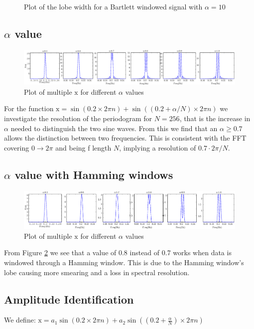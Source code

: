 \documentclass[10pt,twoside,a4paper]{report}
\begin{document}
\begin{figure}[h!]
\centering

\resizebox{\textwidth}{!}{}
\caption{Plot of the lobe width for a Bartlett windowed signal with $\alpha = 10$}
\label{fig:3d2}
\end{figure}
\subsection{$\alpha$ value}
\begin{figure}[h!]
\centering
\includegraphics[width=\textwidth]{cw1im/3b.eps}
\caption{Plot of multiple $\boldsymbol{\mathrm{x}}$ for different $\alpha$ values}
\end{figure}
For the function $\boldsymbol{\mathrm{x}} = \sin(0.2\times 2\pi n)+\sin((0.2+\alpha / N)\times 2\pi n)$ we investigate the resolution of the periodogram for $N=256$, that is the increase in $\alpha$ needed to distinguish the two sine waves. From this we find that an $\alpha \geq 0.7$ allows the distinction between two frequencies. This is consistent with the FFT covering $0 \to 2\pi$ and being f length $N$, implying a resolution of $0.7 \cdot 2\pi / N$.

\subsection{$\alpha$ value with Hamming windows}
\begin{figure}[h!]
\centering
\includegraphics[width=\textwidth]{cw1im/3c.eps}
\caption{Plot of multiple $\boldsymbol{\mathrm{x}}$ for different $\alpha$ values}
\label{fig:3c}
\end{figure}
From Figure \ref{fig:3c} we see that a value of 0.8 instead of 0.7 works when data is windowed through a Hamming window. This is due to the Hamming window's lobe causing more smearing and a loss in spectral resolution.

\subsection{Amplitude Identification}
We define:
$\boldsymbol{\mathrm{x}} = a_1 \sin \left( 0.2\times 2\pi n \right) +a_2 \sin \left( \left( 0.2+\frac{\alpha}{N} \right) \times 2\pi n \right) $
\end{document}
